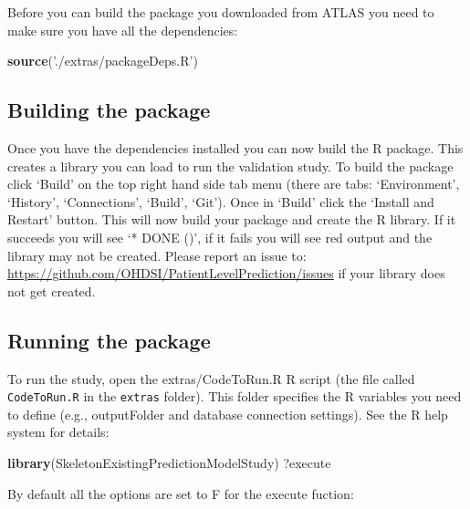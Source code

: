 \documentclass[
]{article}
\newenvironment{Shaded}{\begin{snugshade}}{\end{snugshade}}
\newcommand{\KeywordTok}[1]{\textcolor[rgb]{0.13,0.29,0.53}{\textbf{#1}}}
\newcommand{\NormalTok}[1]{#1}
\newcommand{\StringTok}[1]{\textcolor[rgb]{0.31,0.60,0.02}{#1}}
\begin{document}
Before you can build the package you downloaded from ATLAS you need to
make sure you have all the dependencies:

\begin{Shaded}
\begin{Highlighting}[]
\KeywordTok{source}\NormalTok{(}\StringTok{'./extras/packageDeps.R'}\NormalTok{)}
\end{Highlighting}
\end{Shaded}

\hypertarget{building-the-package}{%
\subsection{Building the package}\label{building-the-package}}

Once you have the dependencies installed you can now build the R
package. This creates a library you can load to run the validation
study. To build the package click `Build' on the top right hand side tab
menu (there are tabs: `Environment', `History', `Connections', `Build',
`Git'). Once in `Build' click the `Install and Restart' button. This
will now build your package and create the R library. If it succeeds you
will see `* DONE ()', if it fails you will see red output and the
library may not be created. Please report an issue to:
\url{https://github.com/OHDSI/PatientLevelPrediction/issues} if your
library does not get created.

\hypertarget{running-the-package}{%
\subsection{Running the package}\label{running-the-package}}

To run the study, open the extras/CodeToRun.R R script (the file called
\texttt{CodeToRun.R} in the \texttt{extras} folder). This folder
specifies the R variables you need to define (e.g., outputFolder and
database connection settings). See the R help system for details:

\begin{Shaded}
\begin{Highlighting}[]
\KeywordTok{library}\NormalTok{(SkeletonExistingPredictionModelStudy)}
\NormalTok{?execute}
\end{Highlighting}
\end{Shaded}

By default all the options are set to F for the execute fuction:
\end{document}
